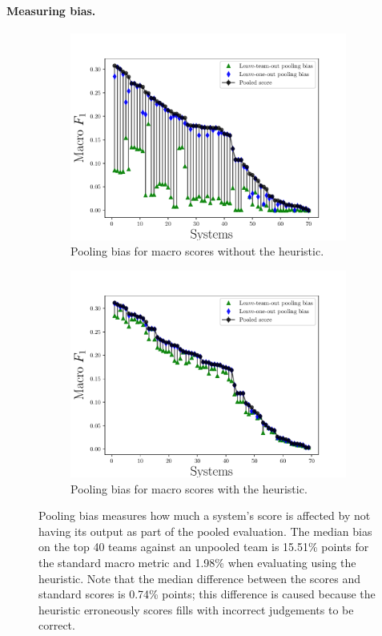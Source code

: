 \paragraph{Measuring bias.}
\begin{figure}[t]
  \begin{subfigure}{\columnwidth}
  \includegraphics[width=\columnwidth]{figures/pooling-bias}
  \caption{Pooling bias for macro \fone{} scores without the \anydoc heuristic.}
  \end{subfigure}
  \begin{subfigure}{\columnwidth}
  \includegraphics[width=\columnwidth]{figures/pooling-bias-anydoc}
  \caption{Pooling bias for macro \fone{} scores with the \anydoc heuristic.}
  \end{subfigure}
  \caption{\label{fig:pooling-bias} Pooling bias measures how much a system's score is affected by not having its output as part of the pooled evaluation.
  The median bias on the top 40 teams against an unpooled team is 15.51\% points for the standard macro \fone{} metric and 1.98\% when evaluating using the \anydoc heuristic.
  Note that the median difference between the \anydoc scores and standard scores is 0.74\% points; this difference is caused because the \anydoc heuristic erroneously scores fills with incorrect judgements to be correct.}
\end{figure}

